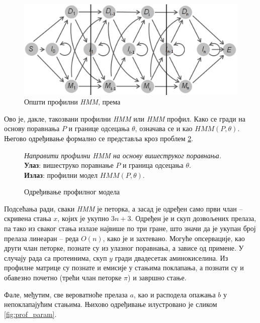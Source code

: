 \documentclass[12pt,oneside]{memoir}
\newenvironment{problem}[1][!ht]
{\renewcommand{\algorithmcfname}{Проблем}
\begin{figure}[!ht]
\centering
  \begin{minipage}{.94\linewidth}
	\begin{algorithm}[#1]%
  }{\end{algorithm}
  \end{minipage}
\end{figure}}
\begin{document}
\begin{CJK}{UTF8}{ipxm}
\begin{figure}[H]
  \centering
  \includegraphics[width=.95\textwidth]{prof_hmm.png}
  \caption{Општи профилни \textit{HMM}, према \cite{compeau2015}}
  \label{fig:prof_hmm}
\end{figure}

Ово је, дакле, такозвани профилни \textit{HMM} или \textit{HMM} профил. Како се гради на основу поравнања $P$ и границе одсецања $\theta$, означава се и као $HMM(P, \theta)$. Његово одређивање формално се представља кроз проблем \ref{prob:prof}.

\begin{problem}[H]
  \SetAlgoLined
  \textit{Направити профилни \textit{HMM} на основу вишеструког поравнања.}\\
  \textbf{Улаз}: вишеструко поравнање $P$ и граница одсецања $\theta$.\\
  \textbf{Излаз}: профилни модел $HMM(P, \theta)$.
  \caption{Одређивање профилног модела\cite{ba10e}}
  \label{prob:prof}
\end{problem}

Подсећања ради, сваки \textit{HMM} је петорка, а засад је одређен само први члан -- скривена стања $x$, којих је укупно $3n+3$. Одређен је и скуп дозвољених прелаза, па тако из сваког стања излазе највише по три гране, што значи да је укупан број прелаза линеаран -- реда $O(n)$, како је и захтевано. Могуће опсервације, као други члан петорке, познате су из улазног поравнања, а зависе од примене. У случају рада са протеинима, скуп $y$ гради двадесетак аминокиселина. Из профилне матрице су познате и емисије у стањима поклапања, а познати су и обавезно почетно (трећи члан петорке $\pi$) и завршно стање.

Фале, међутим, све вероватноће прелаза $a$, као и расподела опажања $b$ у непоклапајућим стањима. Њихово одређивање илустровано је сликом \ref{fig:prof_param}.


\end{CJK}
\end{document}
